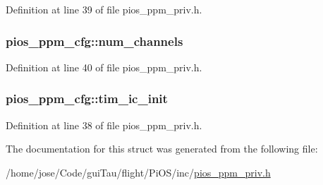 Definition at line 39 of file pios\-\_\-ppm\-\_\-priv.\-h.

\hypertarget{structpios__ppm__cfg_a2b60f6cdabad556a4de0d2617cfe3309}{
\subsubsection[{num\-\_\-channels}]{ pios\-\_\-ppm\-\_\-cfg\-::num\-\_\-channels}}\label{structpios__ppm__cfg_a2b60f6cdabad556a4de0d2617cfe3309}


Definition at line 40 of file pios\-\_\-ppm\-\_\-priv.\-h.

\hypertarget{structpios__ppm__cfg_acecc33ca315a3edeb437b6073c1ec1b5}{
\subsubsection[{tim\-\_\-ic\-\_\-init}]{ pios\-\_\-ppm\-\_\-cfg\-::tim\-\_\-ic\-\_\-init}}\label{structpios__ppm__cfg_acecc33ca315a3edeb437b6073c1ec1b5}


Definition at line 38 of file pios\-\_\-ppm\-\_\-priv.\-h.



The documentation for this struct was generated from the following file\-:\begin{DoxyCompactItemize}
\item 
/home/jose/\-Code/gui\-Tau/flight/\-Pi\-O\-S/inc/\hyperlink{pios__ppm__priv_8h}{pios\-\_\-ppm\-\_\-priv.\-h}\end{DoxyCompactItemize}

